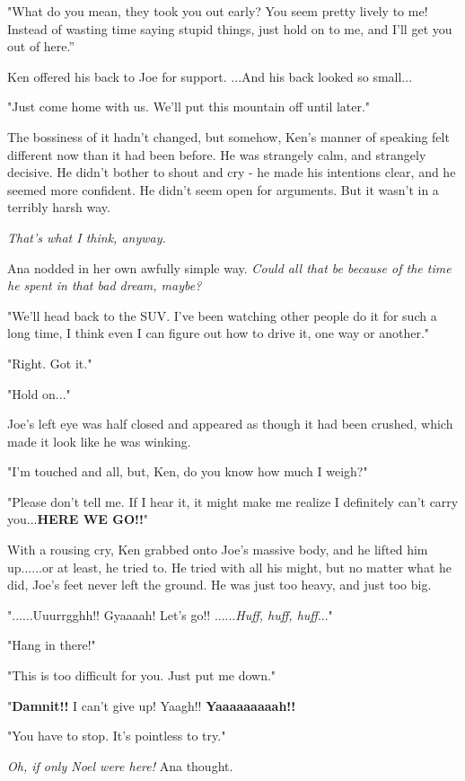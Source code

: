 \documentclass[
]{article}
\begin{document}
"What do you mean, they took you out early? You seem pretty lively to
me! Instead of wasting time saying stupid things, just hold on to me,
and I'll get you out of here.''

Ken offered his back to Joe for support. ...And his back looked so
small...

"Just come home with us. We'll put this mountain off until later."

The bossiness of it hadn't changed, but somehow, Ken's manner of
speaking felt different now than it had been before. He was strangely
calm, and strangely decisive. He didn't bother to shout and cry - he
made his intentions clear, and he seemed more confident. He didn't seem
open for arguments. But it wasn't in a terribly harsh way.

\emph{That's what I think, anyway.}

Ana nodded in her own awfully simple way.\emph{ Could all that be
because of the time he spent in that bad dream, maybe?}

"We'll head back to the SUV. I've been watching other people do it for
such a long time, I think even I can figure out how to drive it, one way
or another."

"Right. Got it."

"Hold on..."

Joe's left eye was half closed and appeared as though it had been
crushed, which made it look like he was winking.

"I'm touched and all, but, Ken, do you know how much I weigh?"

"Please don't tell me. If I hear it, it might make me realize I
definitely can't carry you...\textbf{HERE WE GO!!}"

With a rousing cry, Ken grabbed onto Joe's massive body, and he lifted
him up......or at least, he tried to. He tried with all his might, but
no matter what he did, Joe's feet never left the ground. He was just too
heavy, and just too big.

"......Uuurrgghh!! Gyaaaah! Let's go!! ......\emph{Huff, huff, huff}..."

"Hang in there!"

"This is too difficult for you. Just put me down."

"\textbf{Damnit!!} I can't give up! Yaagh!! \textbf{Yaaaaaaaaah!!}

"You have to stop. It's pointless to try."

\emph{Oh, if only Noel were here!} Ana thought.
\end{document}

